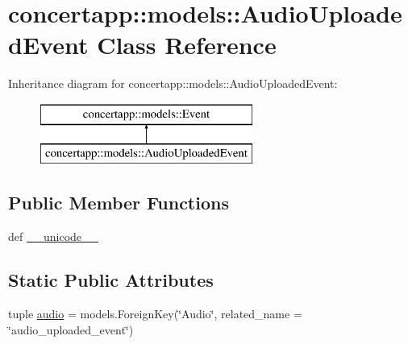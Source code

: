 \hypertarget{classconcertapp_1_1models_1_1_audio_uploaded_event}{
\section{concertapp::models::AudioUploadedEvent Class Reference}
\label{classconcertapp_1_1models_1_1_audio_uploaded_event}
}
Inheritance diagram for concertapp::models::AudioUploadedEvent:\begin{figure}[H]
\begin{center}
\leavevmode
\includegraphics[height=2.000000cm]{classconcertapp_1_1models_1_1_audio_uploaded_event}
\end{center}
\end{figure}
\subsection*{Public Member Functions}
\begin{DoxyCompactItemize}
\item 
def \hyperlink{classconcertapp_1_1models_1_1_audio_uploaded_event_a7645171f116470bd0c385b94d6e4e375}{\_\-\_\-unicode\_\-\_\-}
\end{DoxyCompactItemize}
\subsection*{Static Public Attributes}
\begin{DoxyCompactItemize}
\item 
tuple \hyperlink{classconcertapp_1_1models_1_1_audio_uploaded_event_a43866195b89021cc278e0e60feb21ae8}{audio} = models.ForeignKey(\char`\"{}Audio\char`\"{}, related\_\-name = \char`\"{}audio\_\-uploaded\_\-event\char`\"{})
\end{DoxyCompactItemize}


